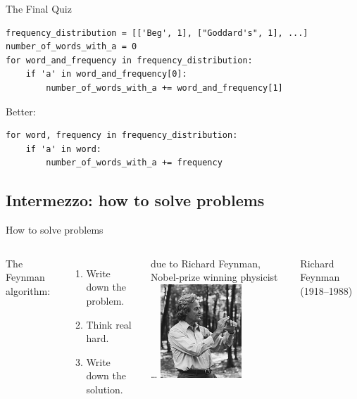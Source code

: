 \documentclass[aspectratio=169,usenames,dvipsnames]{beamer}
\begin{document}
\begin{frame}[fragile]{The Final Quiz}
\begin{lstlisting}
frequency_distribution = [['Beg', 1], ["Goddard's", 1], ...]
number_of_words_with_a = 0
for word_and_frequency in frequency_distribution:
    if 'a' in word_and_frequency[0]:
        number_of_words_with_a += word_and_frequency[1]
\end{lstlisting}

\pause
Better:
\begin{lstlisting}
for word, frequency in frequency_distribution:
    if 'a' in word:
        number_of_words_with_a += frequency
\end{lstlisting}
\end{frame}


\subsection{Intermezzo: how to solve problems}
\frame{\tableofcontents[currentsubsection]}

\begin{frame}{How to solve problems}
    \begin{columns}
            The Feynman algorithm:
            \begin{enumerate}
                \item Write down the problem.
                \item Think real hard.
                \item Write down the solution.
            \end{enumerate}

            \vspace{1em}
            due to Richard Feynman, \\
            Nobel-prize winning physicist \dots
        \centering
            \includegraphics[width=0.6\textwidth]{fig/feynman}

            \vspace{1em} Richard Feynman (1918--1988)
    \end{columns}
\end{frame}
\end{document}
